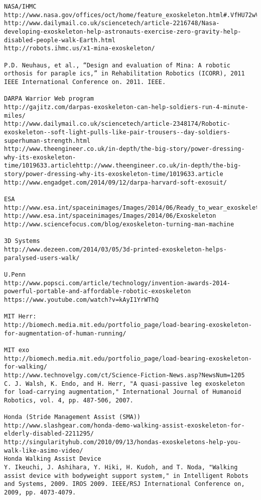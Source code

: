 \documentclass[letterpaper,12pt,fullpage]{article}
\begin{document}
\begin{verbatim}
NASA/IHMC
http://www.nasa.gov/offices/oct/home/feature_exoskeleton.html#.VfHU72wVhBc
http://www.dailymail.co.uk/sciencetech/article-2216748/Nasa-developing-exoskeleton-help-astronauts-exercise-zero-gravity-help-disabled-people-walk-Earth.html
http://robots.ihmc.us/x1-mina-exoskeleton/

P.D. Neuhaus, et al., “Design and evaluation of Mina: A robotic
orthosis for paraple ics,” in Rehabilitation Robotics (ICORR), 2011
IEEE International Conference on. 2011. IEEE.

DARPA Warrior Web program
http://gajitz.com/darpas-exoskeleton-can-help-soldiers-run-4-minute-miles/
http://www.dailymail.co.uk/sciencetech/article-2348174/Robotic-exoskeleton--soft-light-pulls-like-pair-trousers--day-soldiers-superhuman-strength.html
http://www.theengineer.co.uk/in-depth/the-big-story/power-dressing-why-its-exoskeleton-time/1019633.articlehttp://www.theengineer.co.uk/in-depth/the-big-story/power-dressing-why-its-exoskeleton-time/1019633.article
http://www.engadget.com/2014/09/12/darpa-harvard-soft-exosuit/

ESA
http://www.esa.int/spaceinimages/Images/2014/06/Ready_to_wear_exoskeleton
http://www.esa.int/spaceinimages/Images/2014/06/Exoskeleton
http://www.sciencefocus.com/blog/exoskeleton-turning-man-machine

3D Systems
http://www.dezeen.com/2014/03/05/3d-printed-exoskeleton-helps-paralysed-users-walk/

U.Penn
http://www.popsci.com/article/technology/invention-awards-2014-powerful-portable-and-affordable-robotic-exoskeleton
https://www.youtube.com/watch?v=kAyI1YrWThQ

MIT Herr:
http://biomech.media.mit.edu/portfolio_page/load-bearing-exoskeleton-for-augmentation-of-human-running/

MIT exo
http://biomech.media.mit.edu/portfolio_page/load-bearing-exoskeleton-for-walking/
http://www.technovelgy.com/ct/Science-Fiction-News.asp?NewsNum=1205
C. J. Walsh, K. Endo, and H. Herr, "A quasi-passive leg exoskeleton
for load-carrying augmentation," International Journal of Humanoid
Robotics, vol. 4, pp. 487-506, 2007.

Honda (Stride Management Assist (SMA))
http://www.slashgear.com/honda-demo-walking-assist-exoskeleton-for-elderly-disabled-2211295/
http://singularityhub.com/2010/09/13/hondas-exoskeletons-help-you-walk-like-asimo-video/
Honda Walking Assist Device
Y. Ikeuchi, J. Ashihara, Y. Hiki, H. Kudoh, and T. Noda, "Walking
assist device with bodyweight support system," in Intelligent Robots
and Systems, 2009. IROS 2009. IEEE/RSJ International Conference on,
2009, pp. 4073-4079.


\end{verbatim}
\end{document}
